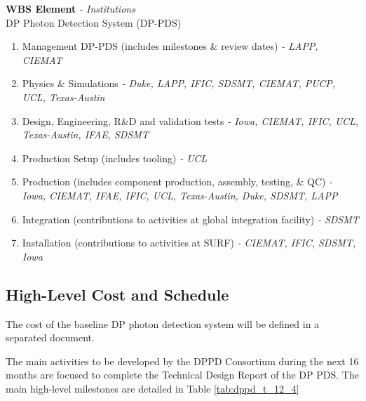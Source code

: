 \textbf{WBS Element} \textit{- Institutions} \\
DP Photon Detection  System (DP-PDS)
\begin{enumerate}
\item Management DP-PDS (includes milestones \& review dates) \textit{- LAPP, CIEMAT }
\item Physics \& Simulations \textit{- Duke, LAPP, IFIC, SDSMT, CIEMAT, PUCP, UCL, Texas-Austin}
\item Design, Engineering, R\&D and validation tests \textit{- Iowa, CIEMAT, IFIC, UCL, Texas-Austin, IFAE, SDSMT}
\item Production Setup (includes tooling) \textit{- UCL}
\item Production (includes component production, assembly, testing, \& QC) \textit{- Iowa, CIEMAT, IFAE, IFIC, UCL, Texas-Austin, Duke, SDSMT, LAPP}
\item Integration (contributions to activities at global integration facility) \textit{- SDSMT}
\item Installation (contributions to activities at SURF) \textit{- CIEMAT, IFIC, SDSMT, Iowa}
\end{enumerate}

\subsection{High-Level Cost and Schedule}
\label{sec:fddp-pd-12.4}

The cost of the baseline DP photon detection system will be defined in a separated document.

The main activities to be developed by the DPPD Consortium during the next 16 months are focused to complete the Technical Design Report of the DP PDS. The main high-level milestones are detailed in Table \ref{tab:dppd_t_12_4}


